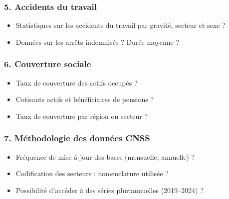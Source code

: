 \documentclass{beamer}
\begin{document}
\begin{frame}
\frametitle{5. Accidents du travail}
\begin{itemize}
  \item Statistiques sur les accidents du travail par gravité, secteur et sexe ?
  \item Données sur les arrêts indemnisés ? Durée moyenne ?
\end{itemize}
\end{frame}

\begin{frame}
\frametitle{6. Couverture sociale}
\begin{itemize}
  \item Taux de couverture des actifs occupés ?
  \item Cotisants actifs et bénéficiaires de pensions ?
  \item Taux de couverture par région ou secteur ?
\end{itemize}
\end{frame}

\begin{frame}
\frametitle{7. Méthodologie des données CNSS}
\begin{itemize}
  \item Fréquence de mise à jour des bases (mensuelle, annuelle) ?
  \item Codification des secteurs : nomenclature utilisée ?
  \item Possibilité d’accéder à des séries pluriannuelles (2019–2024) ?
\end{itemize}
\end{frame}
\end{document}
